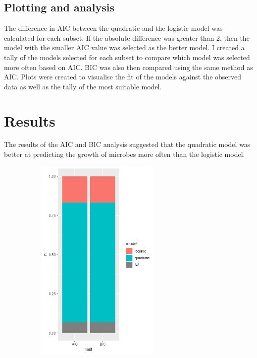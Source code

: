 \documentclass{article}
\begin{document}
\begin{flushleft}
\subsection{Plotting and analysis}

The difference in AIC between the quadratic and the logistic model was calculated for each subset. If the absolute difference was greater than 2, then the model with the smaller AIC value was selected as the better model. I created a tally of the models selected for each subset to compare which model was selected more often based on AIC. BIC was also then compared using the same method as AIC. Plots were created to visualise the fit of the models against the observed data as well as the tally of the most suitable model.

\newpage
\section{Results}
The results of the AIC and BIC analysis suggested that the quadratic model was better at predicting the growth of microbes more often than the logistic model. 


\includegraphics[width=10cm,height=10cm,keepaspectratio]{best_model.png}







\end{flushleft}
\end{document}
